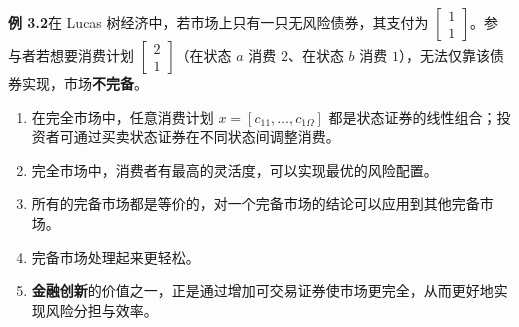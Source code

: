 \begin{tcolorbox}[knowledge,title=3.3 市场的完全性]
\begin{tcolorbox}[example]
\textbf{例 3.2}\quad 在 Lucas 树经济中，若市场上只有一只无风险债券，其支付为 $\begin{bmatrix}1 \\ 1\end{bmatrix}$。参与者若想要消费计划 $\begin{bmatrix}2 \\ 1\end{bmatrix}$（在状态 $a$ 消费 $2$、在状态 $b$ 消费 $1$），无法仅靠该债券实现，市场\textbf{不完备}。
\end{tcolorbox}


\begin{enumerate}
    \item 在完全市场中，任意消费计划 $x=[c_{11},\dots,c_{1\Omega}]$ 都是状态证券的线性组合；投资者可通过买卖状态证券在不同状态间调整消费。
    \item 完全市场中，消费者有最高的灵活度，可以实现最优的风险配置。
    \item 所有的完备市场都是等价的，对一个完备市场的结论可以应用到其他完备市场。
    \item 完备市场处理起来更轻松。
    \item \textbf{金融创新}的价值之一，正是通过增加可交易证券使市场更完全，从而更好地实现风险分担与效率。
\end{enumerate}

\end{tcolorbox}


